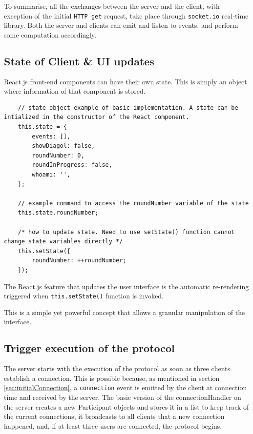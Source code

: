 To summarise, all the exchanges between the server and the client, with exception of the initial \lstinline{HTTP get} request, take place through \lstinline{socket.io} real-time library. Both the server and clients can emit and listen to events, and perform some computation accordingly. 


\subsection{State of Client \& UI updates}
React.js front-end components can have their own state. This is simply an object where information of that component is stored.
\begin{lstlisting}
    // state object example of basic implementation. A state can be intialized in the constructor of the React component.
    this.state = {
        events: [],
        showDiagol: false,
        roundNumber: 0,
        roundInProgress: false,
        whoami: '',
    };
    
    // example command to access the roundNumber variable of the state
    this.state.roundNumber;
    
    /* how to update state. Need to use setState() function cannot change state variables directly */
    this.setState({
        roundNumber: ++roundNumber;
    });
\end{lstlisting}

The React.js feature that updates the user interface is the automatic re-rendering triggered when \lstinline{this.setState()} function is invoked.

This is a simple yet powerful concept that allows a granular manipulation of the interface.


\subsection{Trigger execution of the protocol} \label{sec:triggerProtocol}
The server starts with the execution of the protocol as soon as three clients establish a connection. This is possible because, as mentioned in section \ref{sec:initialConnection}, a \lstinline{connection} event is emitted by the client at connection time and received by the server. The basic version of the connectionHandler on the server creates a new Participant objects and stores it in a list to keep track of the current connections, it broadcasts to all clients that a new connection happened, and, if at least three users are connected, the protocol begins.

